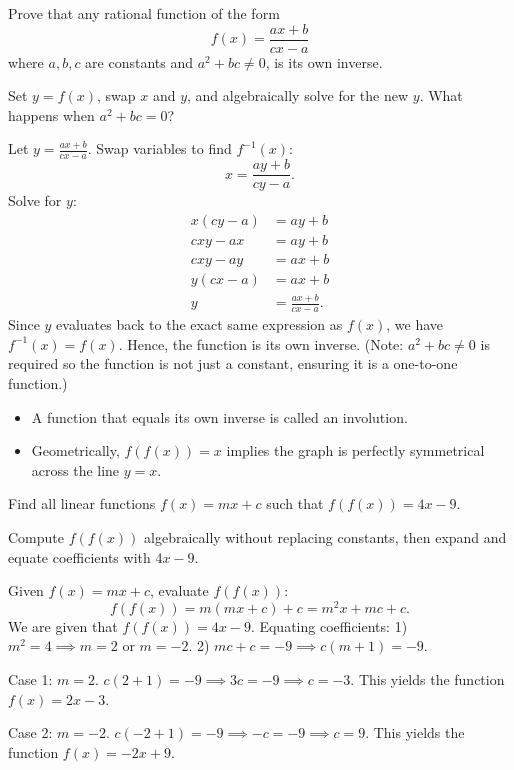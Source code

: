\begin{problem}
Prove that any rational function of the form
\[ f(x) = \frac{ax+b}{cx-a} \]
where $a, b, c$ are constants and $a^2+bc \neq 0$, is its own inverse.
\end{problem}

\begin{hint}
Set $y = f(x)$, swap $x$ and $y$, and algebraically solve for the new $y$. What happens when $a^2+bc = 0$?
\end{hint}

\begin{solution}
Let $y = \frac{ax+b}{cx-a}$.
Swap variables to find $f^{-1}(x)$:
\[ x = \frac{ay+b}{cy-a}. \]
Solve for $y$:
\begin{align*}
x(cy-a) &= ay+b \\
cxy - ax &= ay + b \\
cxy - ay &= ax + b \\
y(cx - a) &= ax + b \\
y &= \frac{ax+b}{cx-a}.
\end{align*}
Since $y$ evaluates back to the exact same expression as $f(x)$, we have $f^{-1}(x) = f(x)$. Hence, the function is its own inverse.
(Note: $a^2+bc \neq 0$ is required so the function is not just a constant, ensuring it is a one-to-one function.)
\end{solution}

\begin{takeaways}
\begin{itemize}[leftmargin=*]
\item A function that equals its own inverse is called an involution.
\item Geometrically, $f(f(x))=x$ implies the graph is perfectly symmetrical across the line $y=x$.
\end{itemize}
\end{takeaways}

\begin{problem}
Find all linear functions $f(x) = mx + c$ such that $f(f(x)) = 4x - 9$.
\end{problem}

\begin{hint}
Compute $f(f(x))$ algebraically without replacing constants, then expand and equate coefficients with $4x-9$.
\end{hint}

\begin{solution}
Given $f(x) = mx+c$, evaluate $f(f(x))$:
\[
f(f(x)) = m(mx+c) + c = m^2x + mc + c.
\]
We are given that $f(f(x)) = 4x - 9$. Equating coefficients:
1) $m^2 = 4 \implies m = 2 \text{ or } m = -2$.
2) $mc + c = -9 \implies c(m+1) = -9$.

Case 1: $m = 2$.
$c(2+1) = -9 \implies 3c = -9 \implies c = -3$.
This yields the function $\boxed{f(x) = 2x - 3}$.

Case 2: $m = -2$.
$c(-2+1) = -9 \implies -c = -9 \implies c = 9$.
This yields the function $\boxed{f(x) = -2x + 9}$.
\end{solution}

